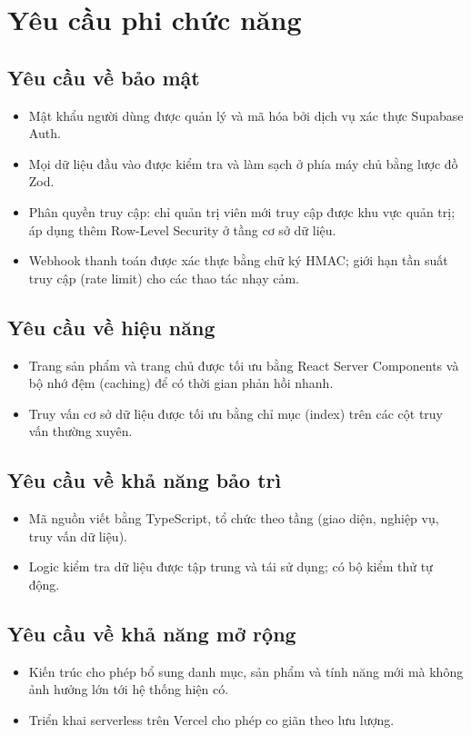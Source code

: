 \section{Yêu cầu phi chức năng}

\subsection{Yêu cầu về bảo mật}
\begin{itemize}
  \item Mật khẩu người dùng được quản lý và mã hóa bởi dịch vụ xác thực Supabase Auth.
  \item Mọi dữ liệu đầu vào được kiểm tra và làm sạch ở phía máy chủ bằng lược đồ Zod.
  \item Phân quyền truy cập: chỉ quản trị viên mới truy cập được khu vực quản trị; áp dụng thêm
  Row-Level Security ở tầng cơ sở dữ liệu.
  \item Webhook thanh toán được xác thực bằng chữ ký HMAC; giới hạn tần suất truy cập (rate
  limit) cho các thao tác nhạy cảm.
\end{itemize}

\subsection{Yêu cầu về hiệu năng}
\begin{itemize}
  \item Trang sản phẩm và trang chủ được tối ưu bằng React Server Components và bộ nhớ đệm
  (caching) để có thời gian phản hồi nhanh.
  \item Truy vấn cơ sở dữ liệu được tối ưu bằng chỉ mục (index) trên các cột truy vấn thường xuyên.
\end{itemize}

\subsection{Yêu cầu về khả năng bảo trì}
\begin{itemize}
  \item Mã nguồn viết bằng TypeScript, tổ chức theo tầng (giao diện, nghiệp vụ, truy vấn dữ liệu).
  \item Logic kiểm tra dữ liệu được tập trung và tái sử dụng; có bộ kiểm thử tự động.
\end{itemize}

\subsection{Yêu cầu về khả năng mở rộng}
\begin{itemize}
  \item Kiến trúc cho phép bổ sung danh mục, sản phẩm và tính năng mới mà không ảnh hưởng lớn
  tới hệ thống hiện có.
  \item Triển khai serverless trên Vercel cho phép co giãn theo lưu lượng.
\end{itemize}

